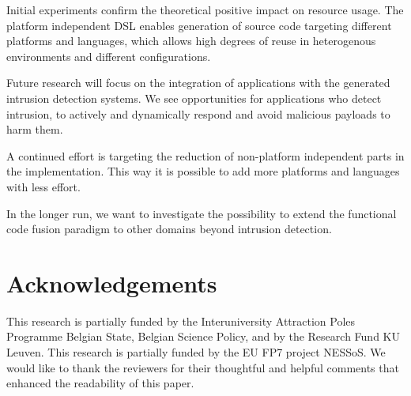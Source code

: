 \documentclass[conference]{IEEEtran}
\begin{document}
Initial experiments confirm the theoretical positive impact on resource usage.
The platform independent DSL enables generation of source code targeting
different platforms and languages, which allows high degrees of reuse in
heterogenous environments and different configurations.

Future research will focus on the integration of applications with the
generated intrusion detection systems. We see opportunities for applications
who detect intrusion, to actively and dynamically respond and avoid malicious
payloads to harm them.

A continued effort is targeting the reduction of non-platform independent parts
in the implementation. This way it is possible to add more platforms and
languages with less effort.

In the longer run, we want to investigate the possibility to extend the
functional code fusion paradigm to other domains beyond intrusion detection.

\section{Acknowledgements}

This research is partially funded by the Interuniversity Attraction Poles
Programme Belgian State, Belgian Science Policy, and by the Research Fund KU
Leuven. This research is partially funded by the EU FP7 project NESSoS\@. We
would like to thank the reviewers for their thoughtful and helpful comments
that enhanced the readability of this paper.



\end{document}

